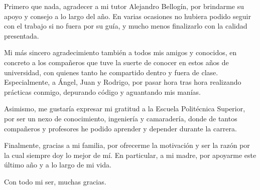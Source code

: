 Primero que nada, agradecer a mi tutor Alejandro Bellogín, por brindarme su apoyo y consejo a lo largo del año. En varias ocasiones no hubiera podido seguir con el trabajo si no fuera por su guía, y mucho menos finalizarlo con la calidad presentada.

Mi más sincero agradecimiento también a todos mis amigos y conocidos, en concreto a los compañeros que tuve la suerte de conocer en estos años de universidad, con quienes tanto he compartido dentro y fuera de clase. Especialmente, a Ángel, Juan y Rodrigo, por pasar hora tras hora realizando prácticas conmigo, depurando código y aguantando mis manías.

Asimismo, me gustaría expresar mi gratitud a la Escuela Politécnica Superior, por ser un nexo de conocimiento, ingeniería y camaradería, donde de tantos compañeros y profesores he podido aprender y depender durante la carrera.

Finalmente, gracias a mi familia, por ofrecerme la motivación y ser la razón por la cual siempre doy lo mejor de mí. En particular, a mi madre, por apoyarme este último año y a lo largo de mi vida.

Con todo mi ser, muchas gracias.